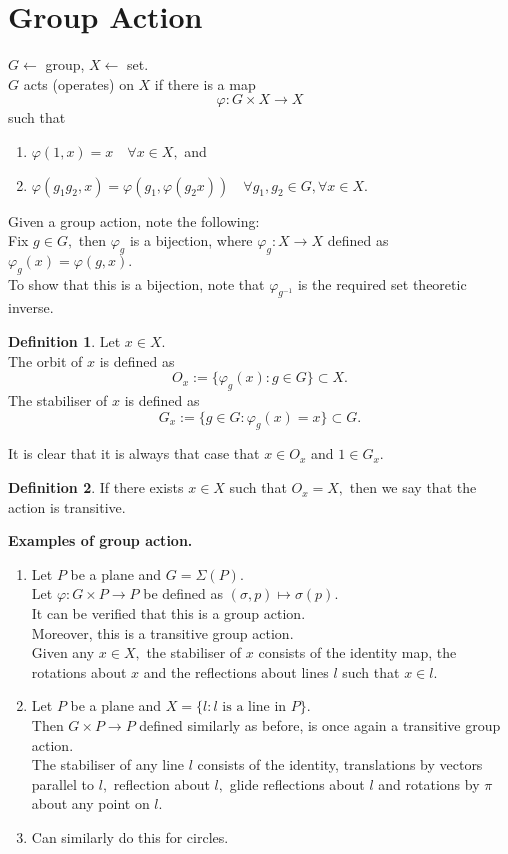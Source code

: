 \documentclass[12 pt, a4paper, toc=graduated, oneside]{article}
\theoremstyle{definition}
\newtheorem{defn}{Definition}
\begin{document}
\section{Group Action}

$G \longleftarrow $ group, $X \longleftarrow $ set.\\
$G$ acts (operates) on $X$ if there is a map
\[\varphi : G \times X \to X\]
such that
\begin{enumerate}[nosep] 
	\item $\varphi(1, x) = x \quad \forall x \in X,$ and
	\item $\varphi(g_1g_2, x) = \varphi(g_1, \varphi(g_2x)) \quad \forall g_1, g_2 \in G, \forall x \in X.$
\end{enumerate}
Given a group action, note the following:\\
Fix $g \in G,$ then $\varphi_g$ is a bijection, where $\varphi_g : X \to X$ defined as $\varphi_g(x) = \varphi(g, x).$\\
To show that this is a bijection, note that $\varphi_{g^{-1}}$ is the required set theoretic inverse.

\begin{defn}
	Let $x \in X.$ \\
	The orbit of $x$ is defined as
	\[O_x := \{\varphi_g(x) : g \in G\} \subset X.\]
	The stabiliser of $x$ is defined as
	\[G_x := \{g \in G : \varphi_g(x) = x\} \subset G.\]
\end{defn}
It is clear that it is always that case that $x \in O_x$ and $1 \in G_x.$
\begin{defn}
	If there exists $x \in X$ such that $O_x = X,$ then we say that the action is transitive.
\end{defn}
\textbf{Examples of group action.}
\begin{enumerate} 
	\item Let $P$ be a plane and $G = \Sigma(P).$\\
	Let $\varphi : G \times P \to P$ be defined as $(\sigma, p) \mapsto \sigma(p).$\\
	It can be verified that this is a group action.\\
	Moreover, this is a transitive group action.\\
	Given any $x \in X,$ the stabiliser of $x$ consists of the identity map, the rotations about $x$ and the reflections about lines $l$ such that $x \in l.$
	\item Let $P$ be a plane and $X = \{l : l \text{ is a line in } P\}.$\\
	Then $G \times P \to P$ defined similarly as before, is once again a transitive group action.\\
	The stabiliser of any line $l$ consists of the identity, translations by vectors parallel to $l,$ reflection about $l,$ glide reflections about $l$ and rotations by $\pi$ about any point on $l.$
	\item Can similarly do this for circles.
\end{enumerate}
\end{document}
